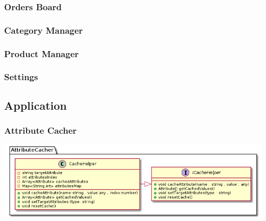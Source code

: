 \documentclass{article}
\begin{document}
\subsubsection{Orders Board}

\subsubsection{Category Manager}

\subsubsection{Product Manager}

\subsubsection{Settings}



\subsection{Application}
\subsubsection{Attribute Cacher}

\includegraphics[scale=0.5]{./out/ReactApp/Application/AttributeCacher/AttributeCacher.png}\\
\end{document}
